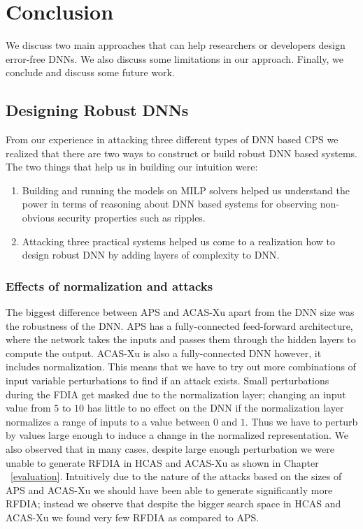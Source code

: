 \chapter{Conclusion}
\label{conclusion}


We discuss two main approaches that can help researchers or developers design error-free \ac{DNN}s. 
We also discuss some limitations in our approach.
Finally, we conclude and discuss some future work.


\section{Designing Robust DNNs}
From our experience in attacking three different types of \ac{DNN} based CPS we realized that there are two ways to construct or build robust \ac{DNN} based systems. 
The two things that help us in building our intuition were:
\begin{enumerate}
	\item Building and running the models on \ac{MILP} solvers helped us understand the power in terms of reasoning about \ac{DNN} based systems for observing non-obvious security properties such as ripples. 
	\item Attacking three practical systems helped  us come to a realization how to design robust \ac{DNN}  by adding layers of complexity to \ac{DNN}. 
\end{enumerate}


\subsection{Effects of normalization and attacks}
The biggest difference between \ac{APS} and \ac{ACAS-Xu} apart from the \ac{DNN} size was the robustness of the \ac{DNN}. 
\ac{APS} has a fully-connected feed-forward architecture, where the network takes the inputs and passes them through the hidden layers to compute the output. 
\ac{ACAS-Xu} is also a fully-connected \ac{DNN} however, it includes normalization.
This means that we have to try out more combinations of input variable perturbations to find if an attack exists. 
Small perturbations during the \ac{FDIA} get masked due to the normalization layer; changing an input value from $5$ to $10$ has little to no effect on the \ac{DNN} if the normalization layer normalizes a range of inputs to a value between $0$ and $1$. 
Thus we have to perturb by values large enough to induce a change in the normalized representation. 
We also observed that in many cases, despite large enough perturbation we were unable to generate \ac{RFDIA} in \ac{HCAS} and \ac{ACAS-Xu} as shown in Chapter ~\ref{evaluation}.
Intuitively due to the nature of the attacks based on the sizes of \ac{APS} and \ac{ACAS-Xu} we should have been able to generate significantly more \ac{RFDIA}; instead we observe that despite the bigger search space in \ac{HCAS} and \ac{ACAS-Xu} we found very few \ac{RFDIA} as compared to \ac{APS}. 


